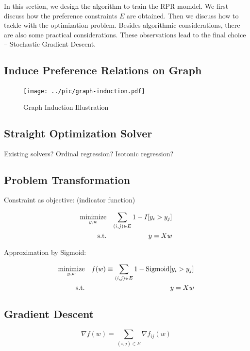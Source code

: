 \documentclass{sig-alternate}
\begin{document}
In this section, we design the algorithm to train the RPR momdel. 
We first discuss how the preference constraints $E$ are obtained. 
Then we discuss how to tackle with the optimization problem. 
Besides algorithmic considerations, 
there are also some practical considerations. 
These observations lead to the final choice -- Stochastic Gradient Descent. 

\subsection{Induce Preference Relations on Graph}
\label{sec:Induce Preference Relations on Graph}

\begin{figure}[t!]
	\centering
	\texttt{[image: ../pic/graph-induction.pdf]}
	\caption{Graph Induction Illustration}
\end{figure}

\subsection{Straight Optimization Solver}
\label{sec:Straight Optimization Solver}

Existing solvers?
Ordinal regression?
Isotonic regression?

\subsection{Problem Transformation}
\label{sec:Problem Transformation}

Constraint as objective: (indicator function)

\begin{eqnarray}
	\operatorname*{minimize}_{y,w} && \sum_{(i,j) \in E} 1 - I[y_i > y_j] \\
	\text{s.t.} && y = Xw
\end{eqnarray}

Approximation by Sigmoid:

\begin{eqnarray}
	\operatorname*{minimize}_{y,w} && f(w) \equiv \sum_{(i,j) \in E} 1 - \text{Sigmoid}[y_i > y_j] \\
	\text{s.t.} && y = Xw
\end{eqnarray}


\subsection{Gradient Descent}
\label{sec:Gradient Descent}

\begin{equation}
	\nabla f(w) = \sum_{(i,j) \in E} \nabla f_{ij}(w) 
\end{equation}
\end{document}

